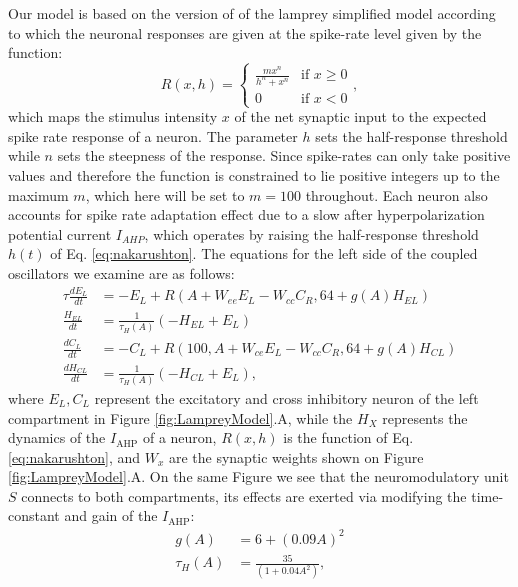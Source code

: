 \documentclass[10pt,a4paper]{article}
\begin{document}
Our model is based on the version of \cite{wilson1999spikes} of the lamprey simplified model \citep{lansner1997realistic}  according to which the neuronal responses are given at the spike-rate level given by the \cite{naka1966s} function:
\begin{equation}
\label{eq:nakarushton}
R(x,h) = \begin{cases} 
\frac{m x^n}{h^n + x^n} &\mbox{if } x \geq 0 \\
0 						&\mbox{if } x < 0
\end{cases},
\end{equation}
which maps the stimulus intensity $x$ of the net synaptic input to the expected spike rate response of a neuron. The parameter $h$ sets the half-response threshold while $n$ sets the steepness of the response. Since spike-rates can only take positive values and therefore the function is constrained to lie positive integers up to the maximum $m$, which here will be set to $m=100$ throughout.%
Each neuron also accounts for spike rate adaptation effect due to a slow after hyperpolarization potential current $I_{AHP}$, which operates by raising the half-response threshold $h(t)$ of Eq. \eqref{eq:nakarushton}. The equations for the left side of the coupled oscillators we examine are as follows:
\begin{align}
\tau \frac{dE_L}{dt} & = - E_L +  R( A + W_{ee} E_L - W_{cc}C_R, 64 + g(A)H_{EL})\\
\frac{H_{EL}}{dt} &= \frac{1}{\tau_H(A)}(-H_{EL}+E_L)\\
\frac{dC_L}{dt} &= -C_L + R(100, A + W_{ce}E_L - W_{cc}C_R, 64+g(A)H_{CL})\\
\frac{dH_{CL}}{dt} &= \frac{1}{\tau_H(A)}(-H_{CL}+E_L),
\end{align}
where $E_L, C_L$ represent the excitatory and cross inhibitory neuron of the left compartment in Figure \ref{fig:LampreyModel}.A, while the $H_{X}$ represents the dynamics of the $I_{\text{AHP}}$ of a neuron, $R(x,h)$ is the \cite{naka1966s} function of Eq. \eqref{eq:nakarushton}, and $W_x$ are the synaptic weights shown on Figure  \ref{fig:LampreyModel}.A. On the same Figure we see that the neuromodulatory unit $S$ connects to both compartments, its effects are exerted via modifying the time-constant and gain of the $I_{\text{AHP}}$:
\begin{align}
g(A) &= 6 + \left( 0.09A \right)^2\\
\tau_H(A) &= \frac{35}{(1 + 0.04 A^2)},
\end{align}
\end{document}
